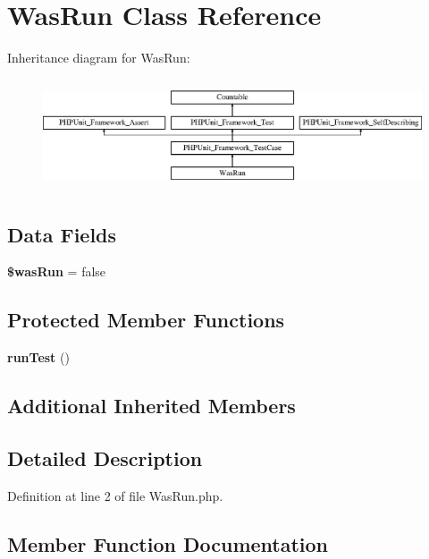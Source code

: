 \section{Was\+Run Class Reference}
\label{class_was_run}
Inheritance diagram for Was\+Run\+:\begin{figure}[H]
\begin{center}
\leavevmode
\includegraphics[height=3.303835cm]{class_was_run}
\end{center}
\end{figure}
\subsection*{Data Fields}
\begin{DoxyCompactItemize}
\item 
{\bf \$was\+Run} = false
\end{DoxyCompactItemize}
\subsection*{Protected Member Functions}
\begin{DoxyCompactItemize}
\item 
{\bf run\+Test} ()
\end{DoxyCompactItemize}
\subsection*{Additional Inherited Members}


\subsection{Detailed Description}


Definition at line 2 of file Was\+Run.\+php.



\subsection{Member Function Documentation}
